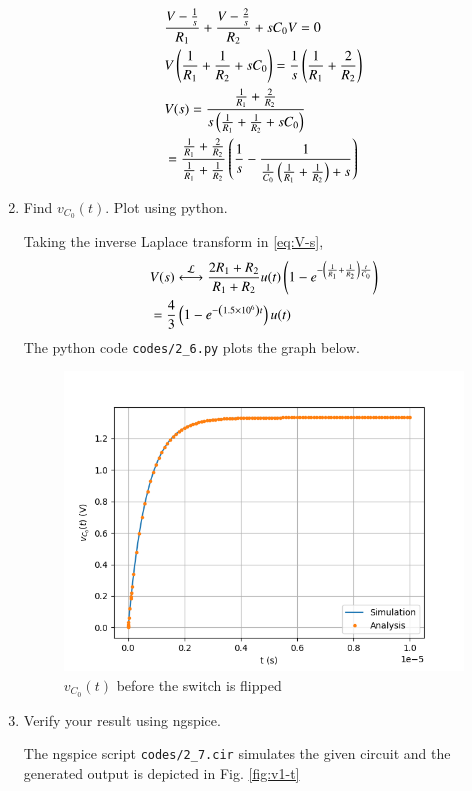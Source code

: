 \documentclass[journal,12pt,twocolumn]{IEEEtran}
\renewcommand\thesection{\arabic{section}}
\begin{document}
\begin{enumerate}[label=\arabic*.,ref=\thesection.\theenumi]
\begin{align}
    &\frac{V - \frac{1}{s}}{R_1} + \frac{V - \frac{2}{s}}{R_2} + sC_0V = 0 \\
    &V\left(\frac{1}{R_1} + \frac{1}{R_2} + sC_0\right) = \frac{1}{s}\left(\frac{1}{R_1} + \frac{2}{R_2}\right) \\
    &V(s) = \frac{\frac{1}{R_1} + \frac{2}{R_2}}{s\left(\frac{1}{R_1} + \frac{1}{R_2} + sC_0\right)} \\
    &= \frac{\frac{1}{R_1} + \frac{2}{R_2}}{\frac{1}{R_1} + \frac{1}{R_2}}\left(\frac{1}{s} - \frac{1}{\frac{1}{C_0}\left(\frac{1}{R_1} + \frac{1}{R_2}\right) + s}\right) 
    \label{eq:V-s}
\end{align}
\item Find $v_{C_0}(t)$.  Plot using python.

\solution Taking the inverse Laplace transform in \eqref{eq:V-s},
\begin{align}
    &V(s) \overset{\mathcal{L}}{\longleftrightarrow} \frac{2R_1 + R_2}{R_1 + R_2}u(t)\left(1 - e^{-\left(\frac{1}{R_1} + \frac{1}{R_2}\right)\frac{t}{C_0}}\right) \\
    &= \frac{4}{3}\left(1 - e^{-\left(1.5 \times 10^6\right)t}\right)u(t)
\end{align}
The python code \texttt{codes/2\_6.py} plots the graph below.
\begin{figure}[!htb]
    \includegraphics[width=\columnwidth]{figs/2_6.png}
    \caption{$v_{C_0}(t)$ before the switch is flipped}
    \label{fig:v1-t}
\end{figure}
\item Verify your result using ngspice.

\solution The ngspice script \texttt{codes/2\_7.cir} simulates the given circuit and the generated output is depicted in Fig. \eqref{fig:v1-t}
\end{enumerate}
\end{document}

